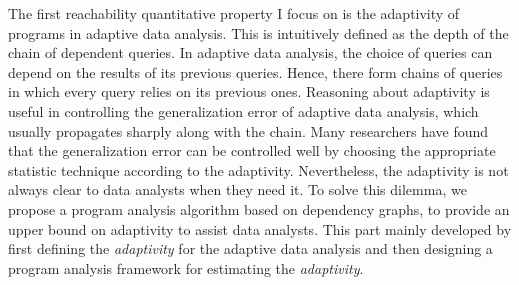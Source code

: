 \begin{abstractpage}
The first reachability quantitative property
 I focus on is the adaptivity of programs in adaptive data analysis.
 This is intuitively defined as the depth of the chain of dependent queries. 
 In adaptive data analysis, the choice of queries can depend on the results of its previous queries. 
 Hence, there form chains of queries in which every query relies on its previous ones.
 Reasoning about adaptivity is useful in controlling the generalization error of adaptive data analysis, which usually propagates sharply along with the chain. 
 Many researchers have found that the generalization error can be controlled well by choosing the appropriate statistic technique according to the adaptivity. Nevertheless, the adaptivity is not always clear to data analysts when they need it. To solve this dilemma, we propose a program analysis algorithm based on dependency graphs, to provide an upper bound on adaptivity to assist data analysts.
This part mainly developed by first defining the \emph{adaptivity} for 
 the adaptive data analysis
 and then designing
 a program analysis framework for estimating the \emph{adaptivity}.




\end{abstractpage}
